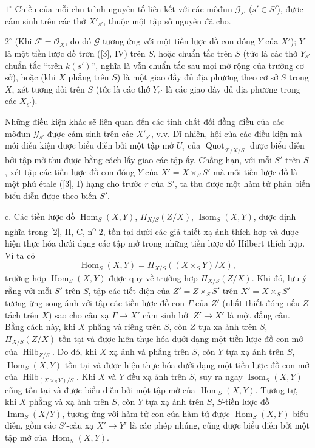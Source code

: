 \smallskip
\noindent $1^\circ$ Chiều của mỗi chu trình nguyên tố liên kết với các môđun
$\mathcal G_{s'}$ ($s'\in S'$), được cảm sinh trên các thớ $X'_{s'}$, thuộc
một tập số nguyên đã cho.

\smallskip
\noindent $2^\circ$ (Khi $\mathcal F=\mathcal O_X$, do đó $\mathcal G$ tương
ứng với một tiền lược đồ con đóng $Y$ của $X'$); $Y$ là một tiền lược đồ trơn
([3], IV) trên $S$, hoặc chuẩn tắc trên $S$ (tức là các thớ $Y_{s'}$ chuẩn
tắc ``trên $k(s')$'', nghĩa là vẫn chuẩn tắc sau mọi mở rộng của trường cơ
sở), hoặc (khi $X$ phẳng trên $S$) là một giao đầy đủ địa phương theo cơ sở
$S$ trong $X$, xét tương đối trên $S$ (tức là các thớ $Y_{s'}$ là các giao
đầy đủ địa phương trong các $X_{s'}$).

Những điều kiện khác sẽ liên quan đến các tính chất đối đồng điều
của các môđun $\mathcal G_{s'}$ được cảm sinh trên các $X'_{s'}$, v.v. Dĩ
nhiên, hội của các điều kiện mà mỗi điều kiện được biểu diễn bởi một tập mở
$U_i$ của $\operatorname{Quot}_{\mathcal F/X/S}$ được biểu diễn bởi tập mở thu
được bằng cách lấy giao các tập ấy. Chẳng hạn, với mỗi $S'$ trên $S$, xét tập
các tiền lược đồ con đóng $Y$ của $X'=X\times_SS'$ mà mỗi tiền lược đồ là một
phủ étale ([3], I) hạng cho trước $r$ của $S'$, ta thu được một hàm tử phản biến
biểu diễn được theo biến $S'$.

\medskip
\noindent c. Các tiền lược đồ $\operatorname{Hom}_S(X,Y)$,
$\Pi_{X/S}(Z/X)$, $\operatorname{Isom}_S(X,Y)$, được định nghĩa trong [2], II,
C, n\textsuperscript{o} 2, tồn tại dưới các giả thiết xạ ảnh thích hợp và được
hiện thực hóa dưới dạng các tập mở trong những tiền lược đồ Hilbert thích hợp.
Vì ta có
\[
\operatorname{Hom}_S(X,Y)=\Pi_{X/S}((X\times_SY)/X),
\]
trường hợp $\operatorname{Hom}_S(X,Y)$ được quy về trường hợp
$\Pi_{X/S}(Z/X)$. Khi đó, lưu ý rằng với mỗi $S'$ trên $S$, tập các tiết diện
của $Z'=Z\times_SS'$ trên $X'=X\times_SS'$ tương ứng song ánh với tập các tiền
lược đồ con $\Gamma$ của $Z'$ (nhất thiết đóng nếu $Z$ tách trên $X$) sao cho
cấu xạ $\Gamma\longrightarrow X'$ cảm sinh bởi $Z'\longrightarrow X'$ là một
đẳng cấu. Bằng cách này,
khi $X$ phẳng và riêng trên $S$, còn $Z$ tựa xạ ảnh trên $S$,
$\Pi_{X/S}(Z/X)$ tồn tại và được hiện thực hóa dưới dạng một tiền lược đồ con mở của
$\operatorname{Hilb}_{Z/S}$. Do đó, khi $X$ xạ ảnh và phẳng trên $S$, còn $Y$
tựa xạ ảnh trên $S$, $\operatorname{Hom}_S(X,Y)$ tồn tại và được hiện thực hóa
dưới dạng một tiền lược đồ con mở của
$\operatorname{Hilb}_{(X\times_SY)/S}$. Khi $X$ và $Y$ đều xạ ảnh trên $S$,
suy ra ngay $\operatorname{Isom}_S(X,Y)$ cũng tồn tại và được biểu diễn bởi
một tập mở của $\operatorname{Hom}_S(X,Y)$. Tương tự, khi $X$ phẳng và xạ ảnh
trên $S$, còn $Y$ tựa xạ ảnh trên $S$, $S$-tiền lược đồ
$\operatorname{Imm}_S(X/Y)$, tương ứng với hàm tử con của hàm tử được
$\operatorname{Hom}_S(X,Y)$ biểu diễn, gồm các $S'$-cấu xạ
$X'\longrightarrow Y'$ là các phép nhúng, cũng được biểu diễn bởi một tập mở
của $\operatorname{Hom}_S(X,Y)$.

